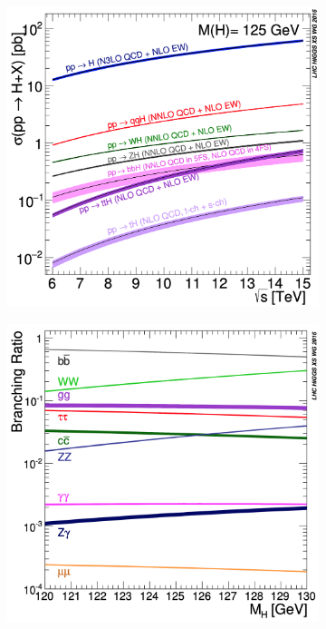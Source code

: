 \begin{figure}[ht]
        \centering
        \begin{subfigure}[b]{0.475\textwidth}
            \centering
            \includegraphics[width=\textwidth]{MSc_Thesis/fig/higgs-xsec-vs-sqrtS.png}
            \vspace{-0.75cm}
            \label{higgs-xsec-vs-sqrtS}
        \end{subfigure}
        \hspace{0.2cm}
        \begin{subfigure}[b]{0.475\textwidth}  
            \centering 
            \includegraphics[width=\textwidth]{MSc_Thesis/fig/higgs-br-vs-mH.png}

\end{subfigure}
\end{figure}
